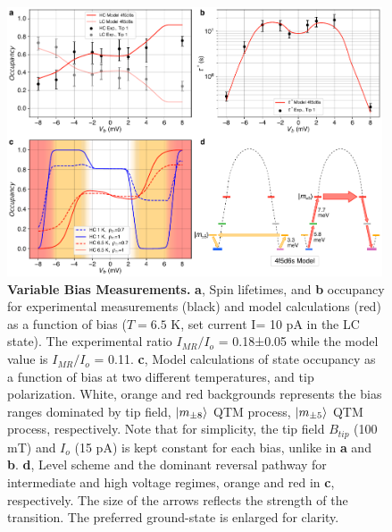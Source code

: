\documentclass[
reprint,amsmath,amssymb,aps]{revtex4-2}
\begin{document}




\begin{figure}[ht!]
\includegraphics[width=0.99\textwidth]{Fig4_new.pdf}
\caption{\textbf{Variable Bias Measurements.} \textbf{a}, Spin lifetimes, and \textbf{b} occupancy for experimental measurements (black) and model calculations (red) as a function of bias ($T = 6.5$ K, set current I= 10 pA in the LC state). The experimental ratio $I_{MR}/I_{o}$ = 0.18±0.05 while the model value is $I_{MR}/I_{o}$ = 0.11. \textbf{c}, Model calculations of state occupancy as a function of bias at two different temperatures, and tip polarization. White, orange and red backgrounds represents the bias ranges dominated by tip field, $\ket {m_{\pm8}}$ QTM process, $\ket {m_{\pm5}}$ QTM process, respectively. Note that for simplicity, the tip field $B_{tip}$ (100 mT) and $I_o$ (15 pA) is kept constant for each bias, unlike in \textbf{a} and \textbf{b}. \textbf{d}, Level scheme and the dominant reversal pathway for intermediate and high voltage regimes, orange and red in \textbf{c}, respectively. The size of the arrows reflects the strength of the transition. The preferred ground-state is enlarged for clarity.
\label{fig:bias} }
\end{figure}
\end{document}
